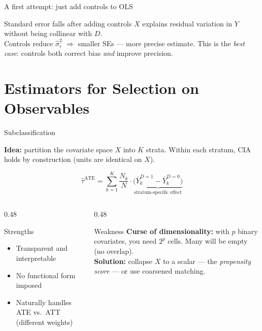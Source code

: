 \documentclass[aspectratio=169, 10pt]{beamer}
\begin{document}
\begin{frame}[shrink=3]{A first attempt: just add controls to OLS}
\begin{overprint}
    \begin{alertblock}{Standard error falls after adding controls}
      $X$ explains residual variation in $Y$ without being collinear with $D$.\\[3pt]
      Controls reduce $\hat\sigma^2_\varepsilon$ $\Rightarrow$ smaller SEs — more precise estimate.
      This is the \emph{best case}: controls both correct bias \emph{and} improve precision.
    \end{alertblock}

  \end{overprint}
\end{frame}

\section{Estimators for Selection on Observables}

\begin{frame}{Subclassification}

  \textbf{Idea:} partition the covariate space $X$ into $K$ strata. Within each stratum, CIA holds by construction (units are identical on $X$).

  \[
    \widehat{\tau}^{\text{ATE}} = \sum_{k=1}^{K} \frac{N_k}{N} \cdot \underbrace{\bigl(\bar{Y}_k^{D=1} - \bar{Y}_k^{D=0}\bigr)}_{\text{stratum-specific effect}}
  \]

  \bigskip
  \begin{columns}[T]
    \begin{column}{0.48\textwidth}
      \begin{exampleblock}{Strengths}
        \begin{itemize}
          \item Transparent and interpretable
          \item No functional form imposed
          \item Naturally handles ATE vs.\ ATT (different weights)
        \end{itemize}
      \end{exampleblock}
    \end{column}
    \begin{column}{0.48\textwidth}
      \begin{alertblock}{Weakness}
        \textbf{Curse of dimensionality:} with $p$ binary covariates, you need $2^p$ cells. Many will be empty (no overlap).\\
        \medskip
        \textbf{Solution:} collapse $X$ to a scalar — the \emph{propensity score} — or use coarsened matching.
      \end{alertblock}
    \end{column}
  \end{columns}
\end{frame}
\end{document}
